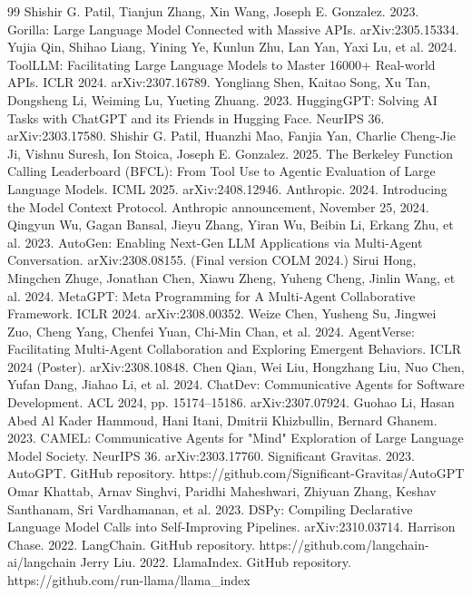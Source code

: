\documentclass[
  sigconf,
  anonymous]{acmart}
\begin{document}
{\begin{thebibliography}{99}
 Shishir G. Patil, Tianjun Zhang, Xin Wang, Joseph E. Gonzalez. 2023. Gorilla: Large Language Model Connected with Massive APIs. arXiv:2305.15334.
 Yujia Qin, Shihao Liang, Yining Ye, Kunlun Zhu, Lan Yan, Yaxi Lu, et al. 2024. ToolLLM: Facilitating Large Language Models to Master 16000+ Real-world APIs. ICLR 2024. arXiv:2307.16789.
 Yongliang Shen, Kaitao Song, Xu Tan, Dongsheng Li, Weiming Lu, Yueting Zhuang. 2023. HuggingGPT: Solving AI Tasks with ChatGPT and its Friends in Hugging Face. NeurIPS 36. arXiv:2303.17580.
 Shishir G. Patil, Huanzhi Mao, Fanjia Yan, Charlie Cheng-Jie Ji, Vishnu Suresh, Ion Stoica, Joseph E. Gonzalez. 2025. The Berkeley Function Calling Leaderboard (BFCL): From Tool Use to Agentic Evaluation of Large Language Models. ICML 2025. arXiv:2408.12946.
 Anthropic. 2024. Introducing the Model Context Protocol. Anthropic announcement, November 25, 2024.
 Qingyun Wu, Gagan Bansal, Jieyu Zhang, Yiran Wu, Beibin Li, Erkang Zhu, et al. 2023. AutoGen: Enabling Next-Gen LLM Applications via Multi-Agent Conversation. arXiv:2308.08155. (Final version COLM 2024.)
 Sirui Hong, Mingchen Zhuge, Jonathan Chen, Xiawu Zheng, Yuheng Cheng, Jinlin Wang, et al. 2024. MetaGPT: Meta Programming for A Multi-Agent Collaborative Framework. ICLR 2024. arXiv:2308.00352.
 Weize Chen, Yusheng Su, Jingwei Zuo, Cheng Yang, Chenfei Yuan, Chi-Min Chan, et al. 2024. AgentVerse: Facilitating Multi-Agent Collaboration and Exploring Emergent Behaviors. ICLR 2024 (Poster). arXiv:2308.10848.
 Chen Qian, Wei Liu, Hongzhang Liu, Nuo Chen, Yufan Dang, Jiahao Li, et al. 2024. ChatDev: Communicative Agents for Software Development. ACL 2024, pp. 15174–15186. arXiv:2307.07924.
 Guohao Li, Hasan Abed Al Kader Hammoud, Hani Itani, Dmitrii Khizbullin, Bernard Ghanem. 2023. CAMEL: Communicative Agents for "Mind" Exploration of Large Language Model Society. NeurIPS 36. arXiv:2303.17760.
 Significant Gravitas. 2023. AutoGPT. GitHub repository. https://github.com/Significant-Gravitas/AutoGPT
 Omar Khattab, Arnav Singhvi, Paridhi Maheshwari, Zhiyuan Zhang, Keshav Santhanam, Sri Vardhamanan, et al. 2023. DSPy: Compiling Declarative Language Model Calls into Self-Improving Pipelines. arXiv:2310.03714.
 Harrison Chase. 2022. LangChain. GitHub repository. https://github.com/langchain-ai/langchain
 Jerry Liu. 2022. LlamaIndex. GitHub repository. https://github.com/run-llama/llama\_index

\end{thebibliography}}
\end{document}
